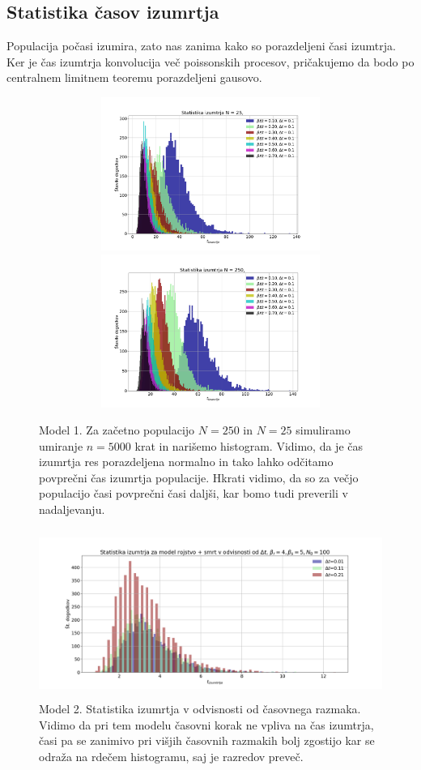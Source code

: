 \documentclass[11pt, a4paper]{article}
\begin{document}
\subsection{Statistika časov izumrtja}
Populacija počasi izumira, zato nas zanima kako so porazdeljeni časi izumtrja. Ker je čas izumtrja konvolucija več poissonskih procesov, pričakujemo da bodo po centralnem limitnem teoremu porazdeljeni gausovo.
 \begin{figure}[H]
\centering

  \includegraphics[width=16cm, height=5cm]{prva_drugidel1b.pdf}
    \includegraphics[width=16cm, height=5cm]{prva_drugidel1c.pdf}
   \caption{Model 1. Za začetno populacijo $N = 250$ in $N = 25$ simuliramo umiranje $n=5000$ krat in narišemo histogram. Vidimo, da je čas izumrtja res porazdeljena normalno in tako lahko odčitamo povprečni čas izumrtja populacije. Hkrati vidimo, da so za večjo populacijo časi povprečni časi daljši, kar bomo tudi preverili v nadaljevanju.}
   
 \end{figure}
 
  \begin{figure}[H]
\centering
  \includegraphics[width=16cm, height=5.5cm]{prva_tretji_del.png}
   \caption{Model 2. Statistika izumrtja v odvisnosti od časovnega razmaka. Vidimo da pri tem modelu časovni korak ne vpliva na čas izumtrja, časi pa se zanimivo pri višjih časovnih razmakih bolj zgostijo kar se odraža na rdečem histogramu, saj je razredov preveč. }   
 \end{figure}
\end{document}
